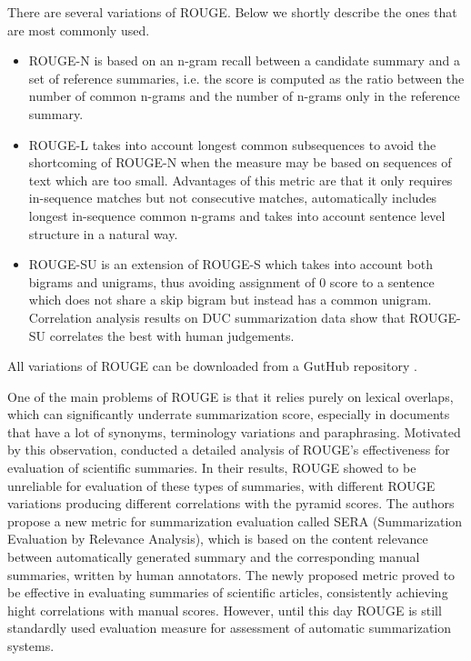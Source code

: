 \documentclass[11pt,a4paper,onecolumn]{article}
\begin{document}
There are several variations of ROUGE. Below we shortly describe the ones that are most commonly used.
\begin{itemize}
\item ROUGE-N is based on an n-gram recall between a candidate summary and a set of reference summaries, i.e. the score is computed as the ratio between the number of common n-grams and the number of n-grams only in the reference summary.
\item ROUGE-L takes into account longest common subsequences to avoid the shortcoming of ROUGE-N when the measure may be based on sequences of text which are too small.
Advantages of this metric are that it only requires in-sequence matches but not consecutive matches, automatically includes longest in-sequence common n-grams and takes into account sentence level structure in a natural way.
\item ROUGE-SU is an extension of ROUGE-S which takes into account both bigrams and unigrams, thus avoiding assignment of 0 score to a sentence which does not share a skip bigram but instead has a common unigram.
Correlation analysis results on DUC summarization data show that ROUGE-SU correlates the best with human judgements.
\end{itemize}
All variations of ROUGE can be downloaded from a GutHub repository \cite{rougerepos}.

One of the main problems of ROUGE is that it relies purely on lexical overlaps, which can significantly underrate summarization score, especially in documents that have a lot of synonyms, terminology variations and paraphrasing.
Motivated by this observation,  conducted a detailed  analysis of ROUGE’s effectiveness for evaluation of scientific summaries.
In their results, ROUGE showed to be unreliable for evaluation of these types of summaries, with different ROUGE variations producing different correlations with the pyramid scores.
The authors propose a new metric for summarization evaluation called SERA (Summarization Evaluation by Relevance Analysis), which is based on the content relevance between automatically generated summary and the corresponding manual summaries, written by human annotators.
The newly proposed metric proved to be effective in evaluating summaries of scientific articles, consistently achieving hight correlations with manual scores.
However, until this day ROUGE is still standardly used evaluation measure for assessment of automatic summarization systems.
\end{document}
